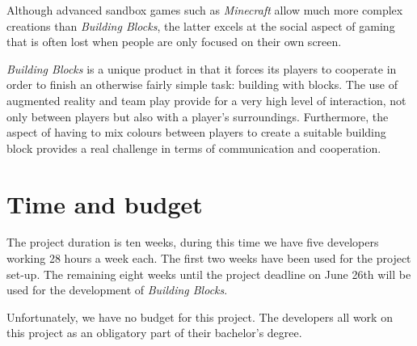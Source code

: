 \documentclass[a4paper,titlepage]{scrartcl}
\begin{document}
Although advanced sandbox games such as \textit{Minecraft} allow much more complex creations than \textit{Building Blocks}, the latter excels at the social aspect of gaming that is often lost when people are only focused on their own screen. 

\textit{Building Blocks} is a unique product in that it forces its players to cooperate in order to finish an otherwise fairly simple task: building with blocks. The use of augmented reality and team play provide for a very high level of interaction, not only between players but also with a player's surroundings. Furthermore, the aspect of having to mix colours between players to create a suitable building block provides a real challenge in terms of communication and cooperation.


\section{Time and budget}
The project duration is ten weeks, during this time we have five developers working 28 hours a week each. The first two weeks have been used for the project set-up. The remaining eight weeks until the project deadline on June 26th will be used for the development of \textit{Building Blocks}.

Unfortunately, we have no budget for this project. The developers all work on this project as an obligatory part of their bachelor's degree.

\newpage
\end{document}
